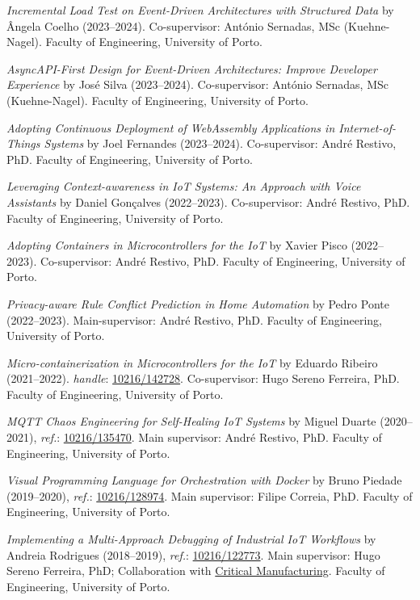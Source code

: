 \documentclass[10pt, a4paper]{article}
\newcommand{\FEUP}{Faculty of Engineering, University of Porto}
\begin{document}
\begin{etaremune}
	\renewcommand\labelenumi{\footnotesize\theenumi .}
    \item \textit{Incremental Load Test on Event-Driven Architectures with Structured Data} by Ângela Coelho (2023--2024).
	Co-supervisor: António Sernadas, MSc (Kuehne-Nagel). \FEUP.
    \item \textit{AsyncAPI-First Design for Event-Driven Architectures: Improve Developer Experience} by José Silva (2023--2024).
	Co-supervisor: António Sernadas, MSc (Kuehne-Nagel). \FEUP.
    \item \textit{Adopting Continuous Deployment of WebAssembly Applications in Internet-of-Things Systems} by Joel Fernandes (2023--2024).
	Co-supervisor: André Restivo, PhD. \FEUP.
	\item \textit{Leveraging Context-awareness in IoT Systems: An Approach with Voice Assistants} by Daniel Gonçalves (2022--2023).
	Co-supervisor: André Restivo, PhD. \FEUP.
	
	\item \textit{Adopting Containers in Microcontrollers for the IoT} by Xavier Pisco (2022--2023).
	Co-supervisor: André Restivo, PhD. \FEUP.

	\item \textit{Privacy-aware Rule Conflict Prediction in Home Automation} by Pedro Ponte (2022--2023).
	Main-supervisor: André Restivo, PhD. \FEUP.

	\item \textit{Micro-containerization in Microcontrollers for the IoT} by Eduardo Ribeiro (2021--2022). \textit{handle}: \href{http://hdl.handle.net/10216/142728}{10216/142728}.
	Co-supervisor: Hugo Sereno Ferreira, PhD. \FEUP.
	
	\item \textit{MQTT Chaos Engineering for Self-Healing IoT Systems} by Miguel Duarte (2020--2021), \textit{ref.}: \href{https://hdl.handle.net/10216/135470}{10216/135470}. Main supervisor: André Restivo, PhD. \FEUP.
	
	\item \textit{Visual Programming Language for Orchestration with Docker} by Bruno Piedade (2019--2020), \textit{ref.}: \href{http://hdl.handle.net/10216/128974}{10216/128974}. Main supervisor: Filipe Correia, PhD. \FEUP.
	
	\item \textit{Implementing a Multi-Approach Debugging of Industrial IoT Workflows} by Andreia Rodrigues (2018--2019), \textit{ref.}: \href{http://hdl.handle.net/10216/122773}{10216/122773}. Main supervisor: Hugo Sereno Ferreira, PhD; Collaboration with \href{https://www.criticalmanufacturing.com/}{Critical Manufacturing}. \FEUP.
	

\end{etaremune}
\end{document}
